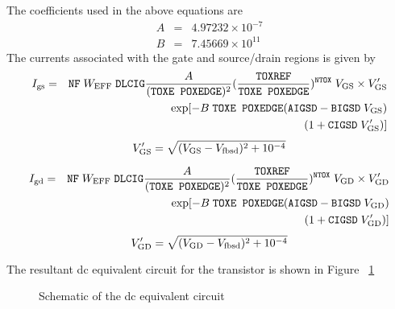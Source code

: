 \documentclass{article}
\begin{document}
The coefficients used in the above equations are
\begin{eqnarray}
A & = & 4.97232 \times 10^{-7} \\
B & = & 7.45669 \times 10^{11}
\end{eqnarray}
The currents associated with the gate and source/drain regions is
given by
\begin{eqnarray}
I_{\rm{gs}}& = & \texttt{NF} \; W_{\rm{EFF}} \; \texttt{DLCIG} {A
\over (\texttt{TOXE POXEDGE})^2}({\texttt{TOXREF} \over
\texttt{TOXE POXEDGE}})^{\texttt{NTOX}} \; V_{\rm{GS}} \times V^{\prime}_{\rm{GS}} \nonumber \\
  & & \exp[-B\;\texttt{TOXE POXEDGE}(\texttt{AIGSD} - \texttt{BIGSD}\;V_{\rm{GS}}) \nonumber \\
  & & (1 + \texttt{CIGSD} \; V^{\prime}_{\rm{GS}})]
\end{eqnarray}
\begin{equation}
V^{\prime}_{\rm{GS}} = \sqrt{(V_{\rm{GS}} - V_{\rm{fbsd}})^2 +
10^{-4}}
\end{equation}

\begin{eqnarray}
I_{\rm{gd}} & = & \texttt{NF} \; W_{\rm{EFF}} \; \texttt{DLCIG} {A
\over (\texttt{TOXE POXEDGE})^2}({\texttt{TOXREF} \over
\texttt{TOXE POXEDGE}})^{\texttt{NTOX}} \; V_{\rm{GD}} \times V^{\prime}_{\rm{GD}} \nonumber \\
  & & \exp[-B\;\texttt{TOXE POXEDGE}(\texttt{AIGSD} - \texttt{BIGSD}\;V_{\rm{GD}}) \nonumber \\
  & &(1 + \texttt{CIGSD} \; V^{\prime}_{\rm{GD}})]
\end{eqnarray}
\begin{equation}
V^{\prime}_{\rm{GD}} = \sqrt{(V_{\rm{GD}} - V_{\rm{fbsd}})^2 +
10^{-4}}
\end{equation}

The resultant dc equivalent circuit for the transistor is shown in
Figure ~\ref{mos.equivalent}
\begin{figure}
\epsfxsize=3in\centerline{} \caption{Schematic of
the dc equivalent circuit\label{mos.equivalent}}
\end{figure}
\end{document}
